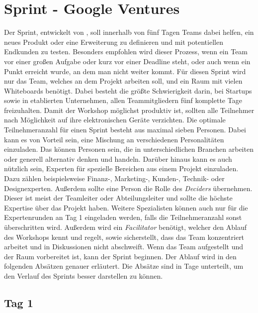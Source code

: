 \section{Sprint - Google Ventures}
\label{sec:Sprint-Grundlagen}
Der Sprint, entwickelt von , soll innerhalb von fünf Tagen Teams dabei helfen, ein neues Produkt oder eine Erweiterung zu definieren und mit potentiellen Endkunden zu testen. Besonders empfohlen wird dieser Prozess, wenn ein Team vor einer großen Aufgabe oder kurz vor einer Deadline steht, oder auch wenn ein Punkt erreicht wurde, an dem man nicht weiter kommt. Für diesen Sprint wird nur das Team, welches an dem Projekt arbeiten soll, und ein Raum mit vielen Whiteboards benötigt. Dabei besteht die größte Schwierigkeit darin, bei Startups sowie in etablierten Unternehmen, allen Teammitgliedern fünf komplette Tage freizuhalten. Damit der Workshop möglichst produktiv ist, sollten alle Teilnehmer nach Möglichkeit auf ihre elektronischen Geräte verzichten. Die optimale Teilnehmeranzahl für einen Sprint besteht aus maximal sieben Personen. Dabei kann es von Vorteil sein, eine Mischung an verschiedenen Personalitäten einzuladen. Das können Personen sein, die in unterschiedlichen Branchen arbeiten oder generell alternativ denken und handeln. Darüber hinaus kann es auch nützlich sein, Experten für spezielle Bereichen aus einem Projekt einzuladen. Dazu zählen beispielsweise Finanz-, Marketing-, Kunden-, Technik- oder Designexperten. Außerdem sollte eine Person die Rolle des \textit{Deciders} übernehmen. Dieser ist meist der Teamleiter oder Abteilungsleiter und sollte die höchste Expertise über das Projekt haben. Weitere Spezialisten können auch nur für die Expertenrunden an Tag 1 eingeladen werden, falls die Teilnehmeranzahl sonst überschritten wird. Außerdem wird ein \textit{Facilitator} benötigt, welcher den Ablauf des Workshops kennt und regelt, sowie sicherstellt, dass das Team konzentriert arbeitet und in Diskussionen nicht abschweift. Wenn das Team aufgestellt und der Raum vorbereitet ist, kann der Sprint beginnen. Der Ablauf wird in den folgenden Absätzen genauer erläutert. Die Absätze sind in Tage unterteilt, um den Verlauf des Sprints besser darstellen zu können.

\subsection*{\label{sec:Sprint-Tag1}\thesubsection\quad Tag 1}
